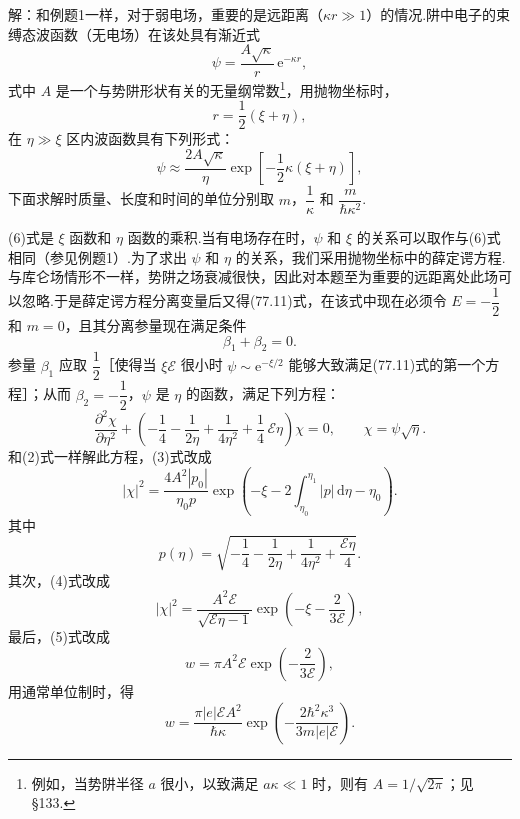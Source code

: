 \begin{xiti}
解：和例题1一样，对于弱电场，重要的是远距离（$\kappa r\gg1$）的情况.阱中电子的束缚态波函数（无电场）在该处具有渐近式
\begin{equation*}
  \psi=\frac{A\sqrt{\kappa}}{r}\,\mathrm{e}^{-\kappa r},
\end{equation*}
式中 $A$ 是一个与势阱形状有关的无量纲常数\footnote{例如，当势阱半径 $a$ 很小，以致满足 $a\kappa\ll1$ 时，则有 $A=1/\sqrt{2\pi}$；见 §133.}，用抛物坐标时，
\begin{equation*}
  r=\frac{1}{2}\left(\xi+\eta\right),
\end{equation*}
在 $\eta\gg\xi$ 区内波函数具有下列形式：
\begin{equation}
  \psi\approx\frac{2A\sqrt{\kappa}}{\eta}
  \exp\left[-\frac{1}{2}\kappa(\xi+\eta)\right],
\end{equation}
下面求解时质量、长度和时间的单位分别取 $m$，$\dfrac{1}{\kappa}$ 和 $\dfrac{m}{\hbar\kappa^{2}}$.

(6)式是 $\xi$ 函数和 $\eta$ 函数的乘积.当有电场存在时，$\psi$ 和 $\xi$ 的关系可以取作与(6)式相同（参见例题1）.为了求出 $\psi$ 和 $\eta$ 的关系，我们采用抛物坐标中的薛定谔方程.与库仑场情形不一样，势阱之场衰减很快，因此对本题至为重要的远距离处此场可以忽略.于是薛定谔方程分离变量后又得(77.11)式，在该式中现在必须令 $E=-\dfrac{1}{2}$ 和 $m=0$，且其分离参量现在满足条件
\begin{equation*}
  \beta_1+\beta_2=0.
\end{equation*}
参量 $\beta_1$ 应取 $\dfrac{1}{2}$［使得当 $\xi\mathcal{E}$ 很小时 $\psi\sim\mathrm{e}^{-\xi/2}$ 能够大致满足(77.11)式的第一个方程］；从而 $\beta_2=-\dfrac{1}{2}$，$\psi$ 是 $\eta$ 的函数，满足下列方程：
\begin{equation*}
  \frac{\partial^{2}\chi}{\partial\eta^{2}}
  +\left(-\frac{1}{4}-\frac{1}{2\eta}+\frac{1}{4\eta^{2}}+\frac{1}{4}\,\mathcal{E}\eta\right)\chi=0,
  \qquad \chi=\psi\sqrt{\eta}.
\end{equation*}
和(2)式一样解此方程，(3)式改成
\begin{equation*}
  |\chi|^{2}=\frac{4A^{2}|p_0|}{\eta_0 p}
  \exp\left(-\xi-2\int_{\eta_0}^{\eta_1}|p|\,\mathrm{d}\eta-\eta_0\right).
\end{equation*}
其中
\begin{equation*}
  p(\eta)=\sqrt{-\frac{1}{4}-\frac{1}{2\eta}+\frac{1}{4\eta^{2}}+\frac{\mathcal{E}\eta}{4}}.
\end{equation*}
其次，(4)式改成
\begin{equation*}
  |\chi|^{2}=\frac{A^{2}\mathcal{E}}{\sqrt{\mathcal{E}\eta-1}}
  \exp\left(-\xi-\frac{2}{3\mathcal{E}}\right),
\end{equation*}
最后，(5)式改成
\begin{equation*}
  w=\pi A^{2}\mathcal{E}\exp\left(-\frac{2}{3\mathcal{E}}\right),
\end{equation*}
用通常单位制时，得
\begin{equation*}
  w=\frac{\pi|e|\mathcal{E}A^{2}}{\hbar\kappa}
  \exp\left(-\frac{2\hbar^{2}\kappa^{3}}{3m|e|\mathcal{E}}\right).
\end{equation*}


\end{xiti}
